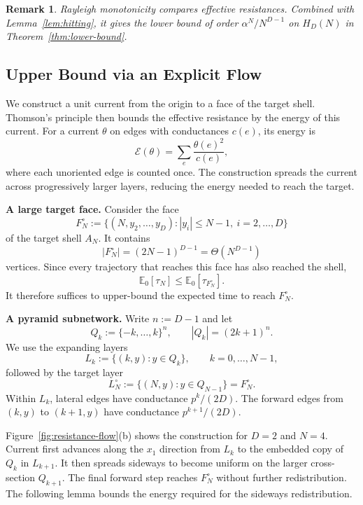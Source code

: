 \documentclass[conference]{IEEEtran}
\newtheorem{remark}{Remark}
\newcommand{\E}{\mathbb{E}}
\begin{document}
\begin{remark}
Rayleigh monotonicity compares effective resistances. Combined with
Lemma~\ref{lem:hitting}, it gives the lower bound of order
$\alpha^N/N^{D-1}$ on $H_D(N)$ in Theorem~\ref{thm:lower-bound}.
\end{remark}

\subsection{Upper Bound via an Explicit Flow}
\label{sec:upper-bound}

We construct a unit current from the origin to a face of the target
shell. Thomson's principle then bounds the effective resistance by
the energy of this current. For a current $\theta$ on edges with
conductances $c(e)$, its energy is
\[
\mathcal E(\theta)=\sum_e \frac{\theta(e)^2}{c(e)},
\]
where each unoriented edge is counted once. The construction spreads
the current across progressively larger layers, reducing the energy
needed to reach the target.

\textbf{A large target face.}
Consider the face
\[
F_N^\circ
:=\{(N,y_2,\dots,y_D): |y_i|\le N-1,\ i=2,\dots,D\}
\]
of the target shell $A_N$. It contains
\[
|F_N^\circ|=(2N-1)^{D-1}=\Theta(N^{D-1})
\]
vertices. Since every trajectory that reaches this face has also
reached the shell,
\[
\E_0[\tau_N]\le \E_0[\tau_{F_N^\circ}].
\]
It therefore suffices to upper-bound the expected time to reach
$F_N^\circ$.

\textbf{A pyramid subnetwork.}
Write $n:=D-1$ and let
\[
Q_k:=\{-k,\dots,k\}^n,
\qquad |Q_k|=(2k+1)^n.
\]
We use the expanding layers
\[
L_k:=\{(k,y):y\in Q_k\},
\qquad k=0,\dots,N-1,
\]
followed by the target layer
\[
L_N^\circ:=\{(N,y):y\in Q_{N-1}\}=F_N^\circ.
\]
Within $L_k$, lateral edges have conductance $p^k/(2D)$.
The forward edges from $(k,y)$ to $(k+1,y)$ have conductance
$p^{k+1}/(2D)$.

Figure~\ref{fig:resistance-flow}(b) shows the construction
for $D=2$ and $N=4$. Current first advances along the
$x_1$ direction from $L_k$ to the embedded copy of $Q_k$
in $L_{k+1}$. It then spreads sideways to become uniform
on the larger cross-section $Q_{k+1}$.
The final forward step reaches $F_N^\circ$ without
further redistribution.
The following lemma bounds the energy required for
the sideways redistribution.
\end{document}
